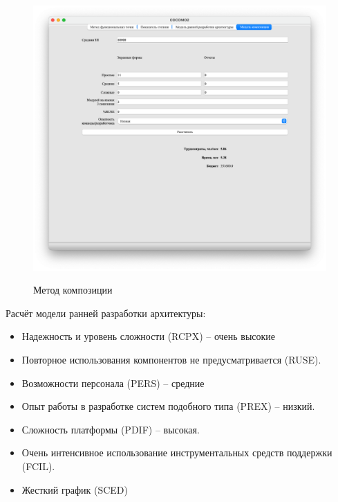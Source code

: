\begin{figure}[ht!]
	\includegraphics[width=1\linewidth]{assets/images/2.4.png}
	\label{fig:r2}
	\caption{Метод композиции}
\end{figure}
\FloatBarrier

Расчёт модели ранней разработки архитектуры:
\begin{itemize}
	\item Надежность и уровень сложности (RCPX) – очень высокие
	\item Повторное использования компонентов не предусматривается (RUSE). 
	\item Возможности персонала (PERS) – средние
	\item Опыт работы в разработке систем подобного типа (PREX) – низкий. 
	\item Сложность платформы (PDIF) – высокая. 
	\item Очень интенсивное использование инструментальных средств поддержки (FCIL). 
	\item Жесткий график (SCED)
\end{itemize}



